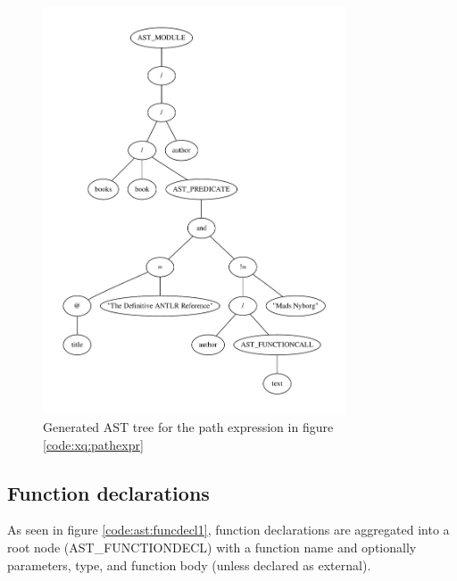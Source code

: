 \pagebreak
\begin{figure}[h!]

\caption{Path expression example, generates AST seen in figure \ref{tree:ast:pathexpr}}
\label{code:xq:pathexpr}
\centering
 \includegraphics[width=0.8\textwidth]{img/graphs/pathexpr}
\caption{Generated AST tree for the path expression in figure 
\ref{code:xq:pathexpr}}
\label{tree:ast:pathexpr}
\end{figure}

\subsection{Function declarations}

As seen in figure \ref{code:ast:funcdecl1}, function declarations are aggregated
into a root node (AST\_FUNCTIONDECL) with a function name and optionally
parameters, type, and function body (unless declared as external).

